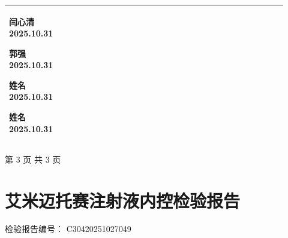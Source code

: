 \documentclass[UTF8,10pt,a4paper,fontset=fandol]{ctexart}
\newcommand{\fieldvalue}[1]{#1}
\newcommand{\handwritten}[1]{#1}
\begin{document}
\begin{tabular}{|p{0.22\linewidth}|p{0.70\linewidth}|}
\fieldvalue{\handwritten{闫心清}}\quad
\fieldvalue{\handwritten{2025.10.31}}
\par

\fieldvalue{\handwritten{郭强}}\quad
\fieldvalue{\handwritten{2025.10.31}}
\par

\fieldvalue{\handwritten{姓名}}\quad
\fieldvalue{\handwritten{2025.10.31}}
\par

\fieldvalue{\handwritten{姓名}}\quad
\fieldvalue{\handwritten{2025.10.31}}
\\
\hline
\end{tabular}

\begin{center}
\small 第 3 页 共 3 页
\end{center}

\newpage

\section*{艾米迈托赛注射液内控检验报告}

检验报告编号：%
\fieldvalue{C30420251027049}
\end{document}
